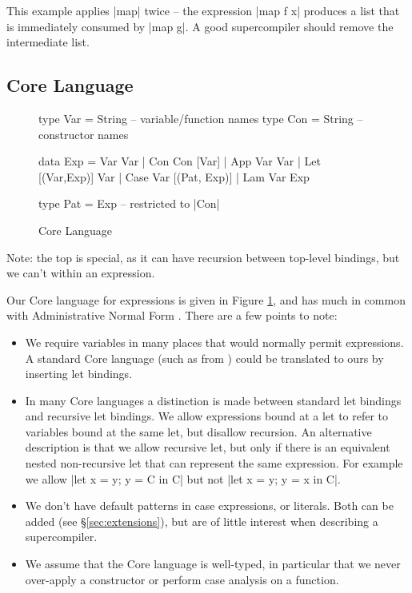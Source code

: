 \documentclass[draft]{sigplanconf}
\begin{document}
This example applies |map| twice -- the expression |map f x| produces a list that is immediately consumed by |map g|. A good supercompiler should remove the intermediate list.

\subsection{Core Language}
\label{sec:core}

\begin{figure}
\begin{code}
type Var   =   String -- variable/function names
type Con   =   String -- constructor names

data Exp   =   Var Var
           |   Con Con [Var]
           |   App Var Var
           |   Let [(Var,Exp)] Var
           |   Case Var [(Pat, Exp)]
           |   Lam Var Exp

type Pat   =   Exp -- restricted to |Con|
\end{code}
\caption{Core Language}
\label{fig:core}
\end{figure}


Note: the top is special, as it can have recursion between top-level bindings, but we can't within an expression.

Our Core language for expressions is given in Figure \ref{fig:core}, and has much in common with Administrative Normal Form \cite{flanagan:continuations}. There are a few points to note:

\begin{itemize}
\item We require variables in many places that would normally permit expressions. A standard Core language (such as from \citet{ghc_core}) could be translated to ours by inserting let bindings.
\item In many Core languages a distinction is made between standard let bindings and recursive let bindings. We allow expressions bound at a let to refer to variables bound at the same let, but disallow recursion. An alternative description is that we allow recursive let, but only if there is an equivalent nested non-recursive let that can represent the same expression. For example we allow |let x = y; y = C in C| but not |let x = y; y = x in C|.
\item We don't have default patterns in case expressions, or literals. Both can be added (see \S\ref{sec:extensions}), but are of little interest when describing a supercompiler.
\item We assume that the Core language is well-typed, in particular that we never over-apply a constructor or perform case analysis on a function.
\end{itemize}
\end{document}
